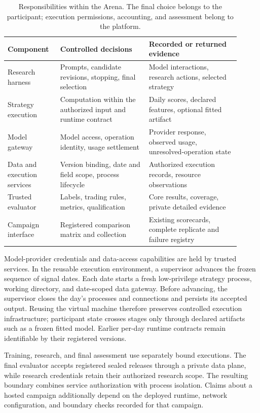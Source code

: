 \begin{table}[t]
    \centering
    \small
    \caption{Responsibilities within the Arena. The final choice belongs to the participant; execution permissions, accounting, and assessment belong to the platform.}
    \label{tab:arena_roles}
    \begin{tabular}{@{}p{0.20\linewidth}p{0.35\linewidth}p{0.36\linewidth}@{}}
        \toprule
        Component & Controlled decisions & Recorded or returned evidence \\
        \midrule
        Research harness & Prompts, candidate revisions, stopping, final selection & Model interactions, research actions, selected strategy \\
        Strategy execution & Computation within the authorized input and runtime contract & Daily scores, declared features, optional fitted artifact \\
        Model gateway & Model access, operation identity, usage settlement & Provider response, observed usage, unresolved-operation state \\
        Data and execution services & Version binding, date and field scope, process lifecycle & Authorized execution records, resource observations \\
        Trusted evaluator & Labels, trading rules, metrics, qualification & Core results, coverage, private detailed evidence \\
        Campaign interface & Registered comparison matrix and collection & Existing scorecards, complete replicate and failure registry \\
        \bottomrule
    \end{tabular}
\end{table}

Model-provider credentials and data-access capabilities are held by trusted services. In the reusable execution environment, a supervisor advances the frozen sequence of signal dates. Each date starts a fresh low-privilege strategy process, working directory, and date-scoped data gateway. Before advancing, the supervisor closes the day's processes and connections and persists its accepted output. Reusing the virtual machine therefore preserves controlled execution infrastructure; participant state crosses stages only through declared artifacts such as a frozen fitted model. Earlier per-day runtime contracts remain identifiable by their registered versions.

Training, research, and final assessment use separately bound executions. The final evaluator accepts registered sealed releases through a private data plane, while research credentials retain their authorized research scope. The resulting boundary combines service authorization with process isolation. Claims about a hosted campaign additionally depend on the deployed runtime, network configuration, and boundary checks recorded for that campaign.

